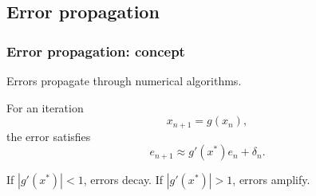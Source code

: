 


\subsection{Error propagation}

\begin{frame}
  \frametitle{Error propagation: concept}
  Errors propagate through numerical algorithms.

  For an iteration
  \[
    x_{n+1} = g(x_n),
  \]
  the error satisfies
  \[
    e_{n+1} \approx g'(x^\ast) e_n + \delta_n.
  \]

  If $|g'(x^\ast)| < 1$, errors decay.
  If $|g'(x^\ast)| > 1$, errors amplify.
\end{frame}

